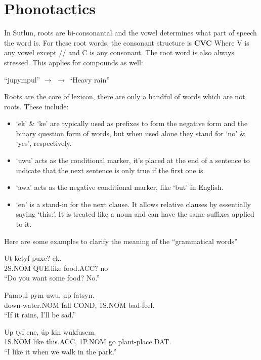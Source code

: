 \documentclass{book}
\begin{document}
\section{Phonotactics}
In Sutlun, roots are bi-consonantal and the vowel determines what part of speech the word is.
For these root words, the consonant structure is \textbf{CVC} Where V is any vowel except //
and C is any consonant. The root word is also always stressed. This applies for compounds as well:

\begin{center}
    ``jupympul'' $\rightarrow$  $\rightarrow$ ``Heavy rain''
\end{center}

Roots are the core of lexicon, there are only a handful of words which are not roots. These include:
\begin{itemize}
    \item `ek' \& `ke' are typically used as prefixes to form the negative form and the binary question
    form of words, but when used alone they stand for `no' \& `yes', respectively.
    \item `uwu' acts as the conditional marker, it's placed at the end of a sentence to indicate that
    the next sentence is only true if the first one is.
    \item `awa' acts as the negative conditional marker, like `but' in English.
    \item `en' is a stand-in for the next clause. It allows relative clauses by
    essentially saying `this:'. It is treated like a noun and can have the same
    suffixes applied to it.
\end{itemize}

Here are some examples to clarify the meaning of the ``grammatical words''

\begin{exe}
    \ex
    \gll Ut ketyf puxe? ek.\\
    2S.NOM QUE.like food.ACC? no \\
    \glt ``Do you want some food? No.''
\end{exe}

\begin{exe}
    \ex
    \gll Pampul pym uwu, up fatsyn.\\
    down-water.NOM fall COND, 1S.NOM bad-feel. \\
    \glt ``If it rains, I'll be sad.''
\end{exe}

\begin{exe}
    \ex
    \gll Up tyf ene, úp kin wukfusem.\\
    1S.NOM like this.ACC, 1P.NOM go plant-place.DAT. \\
    \glt ``I like it when we walk in the park.''
\end{exe}
\end{document}
